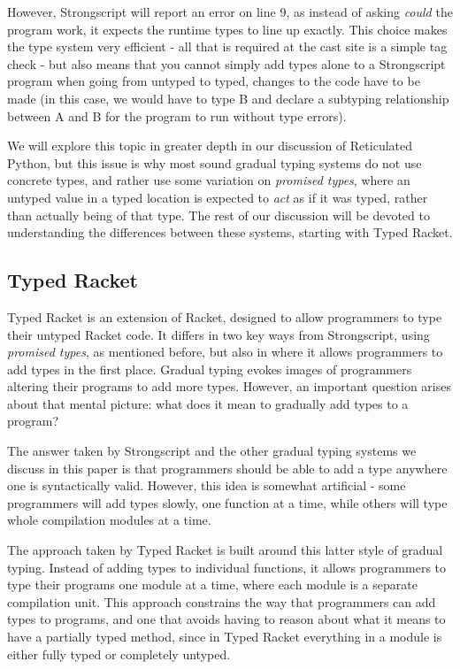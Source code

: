 \documentclass[a4paper,USenglish]{tex/lipics-v2016}
\begin{document}
However, Strongscript will report an error on line 9, as instead of asking
\emph{could} the program work, it expects the runtime types to line up exactly.
This choice makes the type system very efficient - all that is required
at the cast site is a simple tag check - but also means that you cannot simply
add types alone to a Strongscript program when going from untyped to typed,
changes to the code have to be made (in this case, we would have to type
B and declare a subtyping relationship between A and B for the program to
run without type errors).

We will explore this topic in greater depth in our discussion of Reticulated
Python, but this issue is why most sound gradual typing systems do not use
concrete types, and rather use some variation on \emph{promised types}, 
where an untyped value in a typed location is expected to \emph{act} as
if it was typed, rather than actually being of that type. The rest of our
discussion will be devoted to understanding the differences between these 
systems, starting with Typed Racket.

\subsection{Typed Racket}

Typed Racket is an extension of Racket, designed to allow programmers to type
their untyped Racket code. It differs in two key ways from Strongscript, using \emph{promised
types}, as mentioned before, but also in where it allows
programmers to add types in the first place. Gradual typing evokes images of 
programmers altering their programs to add more types. However, an important question arises about 
that mental picture: what does it mean to gradually add types to a program?

The answer taken by Strongscript and the other gradual typing systems we
discuss in this paper is that programmers should be able to add a type
anywhere one is syntactically valid. However, this idea is somewhat
artificial - some programmers will add types slowly, one function at a time,
while others will type whole compilation modules at a time.

The approach taken by Typed Racket is built around this latter style of
gradual typing.  Instead of adding types to individual functions, it allows
programmers to type their programs one module at a time, where each module
is a separate compilation unit.  This approach constrains the way that
programmers can add types to programs, and one that avoids having to reason
about what it means to have a partially typed method, since in Typed Racket
everything in a module is either fully typed or completely untyped.
\end{document}
